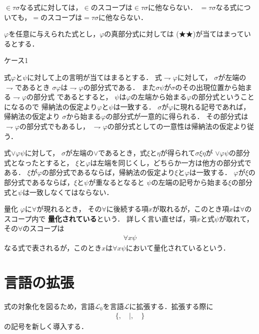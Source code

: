 \documentclass[a4j,10.5pt,oneside,openany]{jsbook}
\theoremstyle{mystyle}
\begin{document}
	$\in \tau \sigma$なる式に対しては，$\in$のスコープは$\in \tau \sigma$に他ならない．
	$= \tau \sigma$なる式についても，$=$のスコープは$= \tau \sigma$に他ならない．
	
	$\varphi$を任意に与えられた式とし，$\varphi$の真部分式に対しては
	(★★)が当てはまっているとする．
	
	\begin{description}
		\item[ケース1] 
	\end{description}
	式$\varphi$と$\psi$に対して上の言明が当てはまるとする．
	式$\rightharpoondown \varphi$に対して，
	$\sigma$が左端の$\rightharpoondown$であるとき
	$\sigma \varphi$は$\rightharpoondown \varphi$の部分式である．
	また$\sigma \psi$が$\sigma$のその出現位置から始まる$\rightharpoondown \varphi$の部分式
	であるとすると，
	$\psi$は$\varphi$の左端から始まる$\varphi$の部分式ということになるので
	帰納法の仮定より$\varphi$と$\psi$は一致する．
	$\sigma$が$\varphi$に現れる記号であれば，帰納法の仮定より
	$\sigma$から始まる$\varphi$の部分式が一意的に得られる．
	その部分式は$\rightharpoondown \varphi$の部分式でもあるし，
	$\rightharpoondown \varphi$の部分式としての一意性は帰納法の仮定より従う．
	
	式$\vee \varphi \psi$に対して，
	$\sigma$が左端の$\vee$であるとき，式$\xi$と$\eta$が得られて$\sigma \xi \eta$が
	$\vee \varphi \psi$の部分式となったとすると，
	$\xi$と$\varphi$は左端を同じくし，どちらか一方は他方の部分式である．
	$\xi$が$\varphi$の部分式であるならば，帰納法の仮定より$\xi$と$\varphi$は一致する．
	$\varphi$が$\xi$の部分式であるならば，$\xi$と$\psi$が重なるとなると
	$\psi$の左端の記号から始まる$\xi$の部分式と$\psi$は一致しなくてはならない．
	
	\begin{itembox}[l]{量化}
		$\varphi$に$\forall$が現れるとき，
		その$\forall$に後続する項$x$が取れるが，このとき項$x$は$\forall$のスコープ内で
		{\bf 量化されている}という．
		詳しく言い直せば，項$x$と式$\psi$が取れて，その$\forall$のスコープは
		\begin{align}
			\forall x \psi
		\end{align}
		なる式で表されるが，このとき$x$は$\forall x \psi$において量化されているという．
	\end{itembox}

\section{言語の拡張}
	式の対象化を図るため，言語$\mathcal{L}_{0}$を言語$\mathcal{L}$に拡張する．拡張する際に
	\begin{align}
		\{, \quad |, \quad \}
	\end{align}
	の記号を新しく導入する．
	
\end{document}
